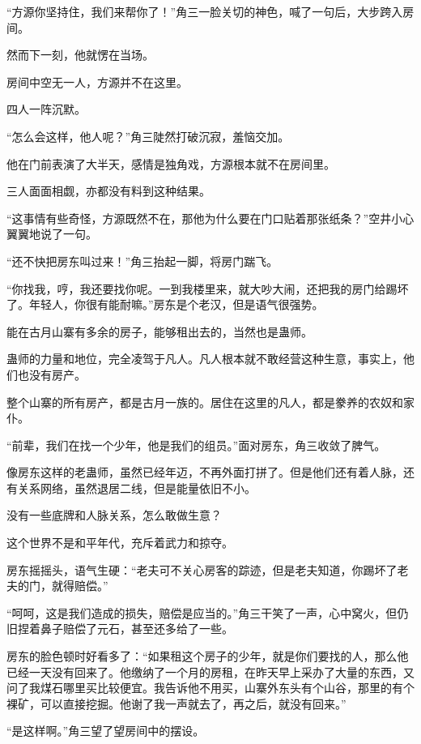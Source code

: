
\begin{this_body}

“方源你坚持住，我们来帮你了！”角三一脸关切的神色，喊了一句后，大步跨入房间。

然而下一刻，他就愣在当场。

房间中空无一人，方源并不在这里。

四人一阵沉默。

“怎么会这样，他人呢？”角三陡然打破沉寂，羞恼交加。

他在门前表演了大半天，感情是独角戏，方源根本就不在房间里。

三人面面相觑，亦都没有料到这种结果。

“这事情有些奇怪，方源既然不在，那他为什么要在门口贴着那张纸条？”空井小心翼翼地说了一句。

“还不快把房东叫过来！”角三抬起一脚，将房门踹飞。

“你找我，哼，我还要找你呢。一到我楼里来，就大吵大闹，还把我的房门给踢坏了。年轻人，你很有能耐嘛。”房东是个老汉，但是语气很强势。

能在古月山寨有多余的房子，能够租出去的，当然也是蛊师。

蛊师的力量和地位，完全凌驾于凡人。凡人根本就不敢经营这种生意，事实上，他们也没有房产。

整个山寨的所有房产，都是古月一族的。居住在这里的凡人，都是豢养的农奴和家仆。

“前辈，我们在找一个少年，他是我们的组员。”面对房东，角三收敛了脾气。

像房东这样的老蛊师，虽然已经年迈，不再外面打拼了。但是他们还有着人脉，还有关系网络，虽然退居二线，但是能量依旧不小。

没有一些底牌和人脉关系，怎么敢做生意？

这个世界不是和平年代，充斥着武力和掠夺。

房东摇摇头，语气生硬：“老夫可不关心房客的踪迹，但是老夫知道，你踢坏了老夫的门，就得赔偿。”

“呵呵，这是我们造成的损失，赔偿是应当的。”角三干笑了一声，心中窝火，但仍旧捏着鼻子赔偿了元石，甚至还多给了一些。

房东的脸色顿时好看多了：“如果租这个房子的少年，就是你们要找的人，那么他已经一天没有回来了。他缴纳了一个月的房租，在昨天早上采办了大量的东西，又问了我煤石哪里买比较便宜。我告诉他不用买，山寨外东头有个山谷，那里的有个裸矿，可以直接挖掘。他谢了我一声就去了，再之后，就没有回来。”

“是这样啊。”角三望了望房间中的摆设。


\end{this_body}
